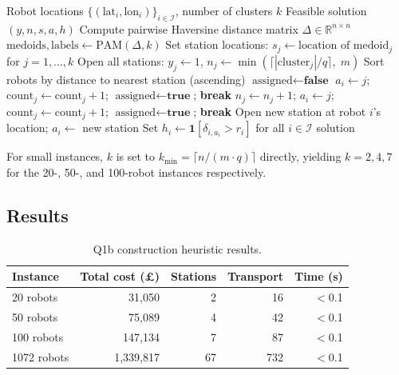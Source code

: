 \documentclass[11pt,a4paper]{article}
\begin{document}
\begin{algorithm}[H]
\caption{Two-phase greedy construction heuristic}
\label{alg:construction}
\begin{algorithmic}[1]
\REQUIRE Robot locations $\{(\text{lat}_i, \text{lon}_i)\}_{i \in \mathcal{I}}$, number of clusters $k$
\ENSURE Feasible solution $(y, n, s, a, h)$
\STATE Compute pairwise Haversine distance matrix $\Delta \in \mathbb{R}^{n \times n}$
\STATE $\text{medoids}, \text{labels} \gets \text{PAM}(\Delta, k)$
\STATE Set station locations: $s_j \gets \text{location of medoid}_j$ for $j = 1, \dots, k$
\STATE Open all stations: $y_j \gets 1$,\;
       $n_j \gets \min\!\left(\lceil |\text{cluster}_j| / q \rceil,\; m\right)$
\STATE Sort robots by distance to nearest station (ascending)
  \STATE $\text{assigned} \gets \textbf{false}$
      \STATE $a_i \gets j$;\; $\text{count}_j \gets \text{count}_j + 1$;\;
             $\text{assigned} \gets \textbf{true}$;\; \textbf{break}
      \STATE $n_j \gets n_j + 1$;\; $a_i \gets j$;\;
             $\text{count}_j \gets \text{count}_j + 1$;\;
             $\text{assigned} \gets \textbf{true}$;\; \textbf{break}
    \ENDIF
  \ENDFOR
    \STATE Open new station at robot $i$'s location;\; $a_i \gets$ new station
  \ENDIF
\ENDFOR
\STATE Set $h_i \gets \mathbf{1}[\delta_{i,a_i} > r_i]$ for all $i \in \mathcal{I}$
\RETURN solution
\end{algorithmic}
\end{algorithm}

For small instances, $k$ is set to $k_{\min} = \lceil n/(m \cdot q) \rceil$ directly, yielding $k = 2, 4, 7$ for the 20-, 50-, and 100-robot instances respectively.
\subsection{Results}

\begin{table}[H]
\centering
\caption{Q1b construction heuristic results.}
\label{tab:q1b}
\begin{tabular}{lrrrr}
\toprule
Instance & Total cost (\pounds) & Stations & Transport & Time (s) \\
\midrule
20 robots   & 31,050    & 2   & 16  & $<$0.1 \\
50 robots   & 75,089    & 4   & 42  & $<$0.1 \\
100 robots  & 147,134   & 7   & 87  & $<$0.1 \\
1072 robots & 1,339,817 & 67  & 732 & $<$0.1 \\
\bottomrule
\end{tabular}
\end{table}
\end{document}
